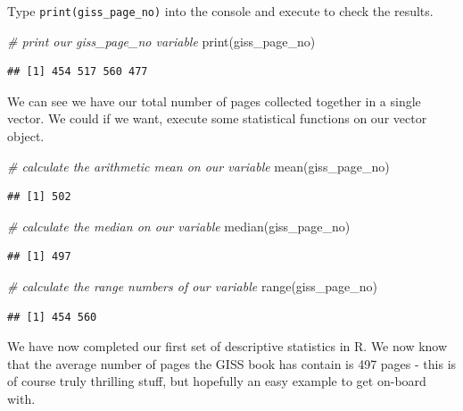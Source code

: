 \documentclass[
]{book}
\newenvironment{Shaded}{\begin{snugshade}}{\end{snugshade}}
\newcommand{\CommentTok}[1]{\textcolor[rgb]{0.56,0.35,0.01}{\textit{#1}}}
\newcommand{\FunctionTok}[1]{\textcolor[rgb]{0.00,0.00,0.00}{#1}}
\newcommand{\NormalTok}[1]{#1}
\begin{document}
Type \texttt{print(giss\_page\_no)} into the console and execute to check the results.

\begin{Shaded}
\begin{Highlighting}[]
\CommentTok{\# print our giss\_page\_no variable}
\FunctionTok{print}\NormalTok{(giss\_page\_no)}
\end{Highlighting}
\end{Shaded}

\begin{verbatim}
## [1] 454 517 560 477
\end{verbatim}

We can see we have our total number of pages collected together in a single vector. We could if we want, execute some statistical functions on our vector object.

\begin{Shaded}
\begin{Highlighting}[]
\CommentTok{\# calculate the arithmetic mean on our variable}
\FunctionTok{mean}\NormalTok{(giss\_page\_no)}
\end{Highlighting}
\end{Shaded}

\begin{verbatim}
## [1] 502
\end{verbatim}

\begin{Shaded}
\begin{Highlighting}[]
\CommentTok{\# calculate the median on our variable}
\FunctionTok{median}\NormalTok{(giss\_page\_no)}
\end{Highlighting}
\end{Shaded}

\begin{verbatim}
## [1] 497
\end{verbatim}

\begin{Shaded}
\begin{Highlighting}[]
\CommentTok{\# calculate the range numbers of our variable}
\FunctionTok{range}\NormalTok{(giss\_page\_no)}
\end{Highlighting}
\end{Shaded}

\begin{verbatim}
## [1] 454 560
\end{verbatim}

We have now completed our first set of descriptive statistics in R. We now know that the average number of pages the GISS book has contain is 497 pages - this is of course truly thrilling stuff, but hopefully an easy example to get on-board with.
\end{document}

